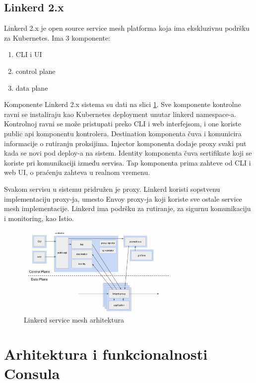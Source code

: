 \documentclass[a4paper,12pt]{report}
\begin{document}
\subsection{Linkerd 2.x}

Linkerd 2.x je open source service mesh platforma koja ima ekskluzivnu podršku za Kubernetes. Ima 3 komponente:

\begin{enumerate}
	\item CLI i UI
	\item  control plane
	\item  data plane
\end{enumerate}

Komponente Linkerd 2.x sistema su dati na slici \ref{fig:linkerd-architecture}. Sve komponente kontrolne ravni se instaliraju kao Kubernetes deployment unutar linkerd namespace-a. Kontrolnoj ravni se može pristupati preko CLI i web interfejsom, i one koriste public api komponentu kontrolera. Destination komponenta čuva i komunicira informacije o rutiranju proksijima. Injector komponenta dodaje proxy svaki put kada se novi pod deploy-a na sistem. Identity komponenta čuva sertifikate koji se koriste pri komunikaciji između servisa. Tap komponenta prima zahteve od CLI i web UI, o praćenju zahteva u realnom vremenu.\newline

Svakom servisu u sistemu pridružen je proxy. Linkerd koristi sopstvenu implementaciju proxy-ja, umesto Envoy proxy-ja koji koriste sve ostale service mesh implementacije. Linkerd ima podršku za rutiranje, za sigurnu komunikaciju i monitoring, kao Istio. 

\begin{figure}[h]
    \centering
    \includegraphics[width=0.7\textwidth]{linkerd_architecture}
    \caption{Linkerd service mesh arhitektura}
    \label{fig:linkerd-architecture}
\end{figure}


\section{Arhitektura i funkcionalnosti Consula}
\end{document}
